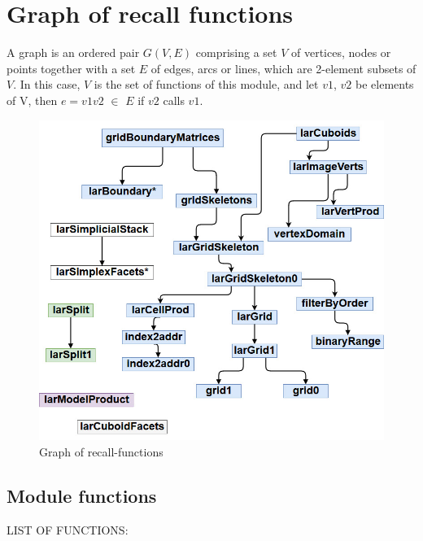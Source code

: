\documentclass{article}
\begin{document}
\section{Graph of recall functions}
A graph is an ordered pair $G(V, E)$ comprising a set $V$ of vertices, nodes or points together with a set $E$ of edges, arcs or lines, which are 2-element subsets of $V$. In this case, $V$ is the set of functions of this module, and let $v1$, $v2$ be elements of V, then $e = v1v2$ $\in$  $E$ if $v2$ calls $v1$.
\begin{figure}[h!]
\centering
\includegraphics[scale=0.4]{grafo.jpg}
\caption{Graph of recall-functions}
\label{fig:grafo}
\end{figure}

\subsection{Module functions}

LIST OF FUNCTIONS:
\end{document}
